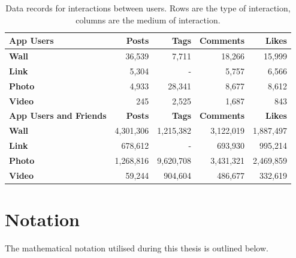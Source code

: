 \begin{table}[tbh!]
\centering
	\begin{tabular}{|l|r|r|r|r|} %
		\hline
		\textbf{App Users} & \textbf{Posts} & \textbf{Tags} & \textbf{Comments} & \textbf{Likes}  \\ \hline
		\textbf{Wall} & 36,539 & 7,711 & 18,266 & 15,999 \\ \hline
		\textbf{Link} & 5,304 & - & 5,757 & 6,566 \\ \hline
		\textbf{Photo} & 4,933 & 28,341 & 8,677 & 8,612 \\ \hline
		\textbf{Video} & 245 & 2,525 & 1,687 & 843 \\ \hline
		 \hline
		\textbf{App Users and Friends} & \textbf{Posts} & \textbf{Tags} & \textbf{Comments} & \textbf{Likes}  \\ \hline
		\textbf{Wall} & 4,301,306 & 1,215,382 & 3,122,019 & 1,887,497 \\ \hline
		\textbf{Link} & 678,612 & - & 693,930 & 995,214 \\ \hline
		\textbf{Photo} & 1,268,816 & 9,620,708 & 3,431,321 & 2,469,859 \\ \hline
		\textbf{Video} & 59,244 & 904,604 & 486,677 & 332,619 \\ \hline
	\end{tabular}
	\caption{Data records for interactions between users. Rows are the type of interaction, columns are the medium of interaction.}
	\label{tab:revpol}
\end{table}

\section{Notation}
\label{sec:notation}

The mathematical notation utilised during this thesis is outlined below.

